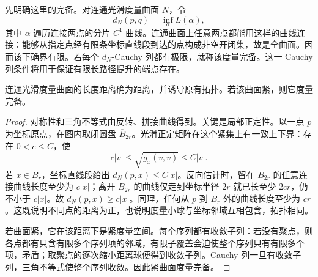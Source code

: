 \ProseParagraphBreak

先明确这里的完备。对连通光滑度量曲面 \(N\)，令
\[
	d_N(p,q)=\inf_\alpha L(\alpha),
\]
其中 \(\alpha\) 遍历连接两点的分片 \(C^1\) 曲线。连通曲面上任意两点都能用这样的曲线连接：能够从指定点经有限条坐标直线段到达的点构成非空开闭集，故是全曲面。因而该下确界有限。若每个 \(d_N\)-Cauchy 列都有极限，就称该度量完备。这一 Cauchy 列条件将用于保证有限长路径提升的端点存在。

\begin{proposition}
	\label{g1:prop:compact-metric-complete}
	连通光滑度量曲面的长度距离确为距离，并诱导原有拓扑。若该曲面紧，则它度量完备。
\end{proposition}
\begin{proof}
	对称性和三角不等式由反转、拼接曲线得到。关键是局部正定性。以一点 \(p\) 为坐标原点，在图内取闭圆盘 \(\overline B_{2r}\)。光滑正定矩阵在这个紧集上有一致上下界：存在 \(0<c\le C\)，使
	\[
		c|v|\le\sqrt{g_x(v,v)}\le C|v|.
	\]
	若 \(x\in B_r\)，坐标直线段给出 \(d_N(p,x)\le C|x|\)。反向估计时，留在 \(B_{2r}\) 的任意连接曲线长度至少为 \(c|x|\)；离开 \(B_{2r}\) 的曲线仅走到坐标半径 \(2r\) 就已长至少 \(2cr\)，仍不小于 \(c|x|\)。故 \(d_N(p,x)\ge c|x|\)。同理，任何从 \(p\) 到 \(B_r\) 外的曲线长度至少为 \(cr\)。这既说明不同点的距离为正，也说明度量小球与坐标邻域互相包含，拓扑相同。

	若曲面紧，它在该距离下是紧度量空间。每个序列都有收敛子列：若没有聚点，则各点都有只含有限多个序列项的邻域，有限子覆盖会迫使整个序列只有有限多个项，矛盾；取聚点的逐次缩小距离球便得到收敛子列。Cauchy 列一旦有收敛子列，三角不等式使整个序列收敛。因此紧曲面度量完备。
\end{proof}

